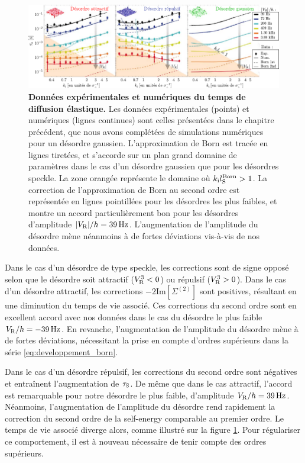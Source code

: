 \begin{figure}
\centering
\includegraphics[width=\textwidth]{Fig/TauS_NJP/donnees_taus_ordre3.pdf}
\caption{\textbf{Données expérimentales et numériques du temps de diffusion élastique.} Les données expérimentales (points) et numériques (lignes continues) sont celles présentées dans le chapitre précédent, que nous avons complétées de simulations numériques pour un désordre gaussien. L'approximation de Born est tracée en lignes tiretées, et s'accorde sur un plan grand domaine de paramètres dans le cas d'un désordre gaussien que pour les désordres speckle. La zone orangée représente le domaine où $k_{\mathrm{i}}l_{\mathrm{S}}^{\mathrm{Born}}>1$. La correction de l'approximation de Born au second ordre est représentée en lignes pointillées pour les désordres les plus faibles, et montre un accord particulièrement bon pour les désordres d'amplitude $|V_{\mathrm{R}}|/h=\SI{39}{\hertz}$. L'augmentation de l'amplitude du désordre mène néanmoins à de fortes déviations vis-à-vis de nos données.}
\label{fig:donnees_taus_ordre_3}
\end{figure}

Dans le cas d'un désordre de type speckle, les corrections sont de signe opposé selon que le désordre soit attractif ($V_{\mathrm{R}}^3<0$) ou répulsif ($V_{\mathrm{R}}^3>0$). Dans le cas d'un désordre attractif, les corrections $-2\mathrm{Im}[\Sigma^{(2)}]$ sont positives, résultant en une diminution du temps de vie associé. Ces corrections du second ordre sont en excellent accord avec nos données dans le cas du désordre le plus faible $V_{\mathrm{R}}/h=\SI{-39}{\hertz}$. En revanche, l'augmentation de l'amplitude du désordre mène à de fortes déviations, nécessitant la prise en compte d'ordres supérieurs dans la série \ref{eq:developpement_born}. 

Dans le cas d'un désordre répulsif, les corrections du second ordre sont négatives et entraînent l'augmentation de $\tau_{\mathrm{S}}$. De même que dans le cas attractif, l'accord est remarquable pour notre désordre le plus faible, d'amplitude $V_{\mathrm{R}}/h=\SI{39}{\hertz}$. Néanmoins, l'augmentation de l'amplitude du désordre rend rapidement la correction du second ordre de la self-energy comparable au premier ordre. Le temps de vie associé diverge alors, comme illustré sur la figure \ref{fig:donnees_taus_ordre_3}. Pour régulariser ce comportement, il est à nouveau nécessaire de tenir compte des ordres supérieurs. 


